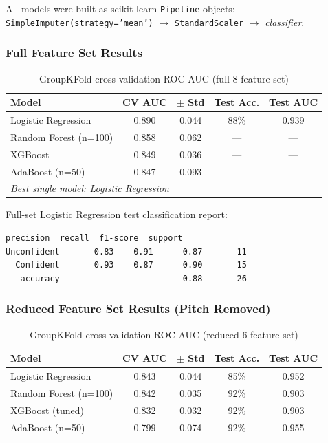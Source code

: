 \documentclass[12pt,a4paper]{article}
\begin{document}
All models were built as scikit-learn \texttt{Pipeline} objects:
\texttt{SimpleImputer(strategy='mean')} $\rightarrow$ \texttt{StandardScaler} $\rightarrow$ \textit{classifier}.

\subsubsection{Full Feature Set Results}

\begin{table}[H]
\centering
\caption{GroupKFold cross-validation ROC-AUC (full 8-feature set)}
\small
\begin{tabular}{l c c c c}
\toprule
\textbf{Model} & \textbf{CV AUC} & \textbf{$\pm$ Std} & \textbf{Test Acc.} & \textbf{Test AUC} \\
\midrule
Logistic Regression & 0.890 & 0.044 & 88\% & 0.939 \\
Random Forest (n=100) & 0.858 & 0.062 & --- & --- \\
XGBoost & 0.849 & 0.036 & --- & --- \\
AdaBoost (n=50) & 0.847 & 0.093 & --- & --- \\
\midrule
\multicolumn{5}{l}{\textit{Best single model: Logistic Regression}} \\
\bottomrule
\end{tabular}
\end{table}

Full-set Logistic Regression test classification report:
\begin{lstlisting}[numbers=none]
              precision  recall  f1-score  support
Unconfident       0.83    0.91      0.87       11
  Confident       0.93    0.87      0.90       15
   accuracy                         0.88       26
\end{lstlisting}

\subsubsection{Reduced Feature Set Results (Pitch Removed)}

\begin{table}[H]
\centering
\caption{GroupKFold cross-validation ROC-AUC (reduced 6-feature set)}
\small
\begin{tabular}{l c c c c}
\toprule
\textbf{Model} & \textbf{CV AUC} & \textbf{$\pm$ Std} & \textbf{Test Acc.} & \textbf{Test AUC} \\
\midrule
Logistic Regression & 0.843 & 0.044 & 85\% & 0.952 \\
Random Forest (n=100) & 0.842 & 0.035 & 92\% & 0.903 \\
XGBoost (tuned) & 0.832 & 0.032 & 92\% & 0.903 \\
AdaBoost (n=50) & 0.799 & 0.074 & 92\% & 0.955 \\
\bottomrule
\end{tabular}
\end{table}
\end{document}
